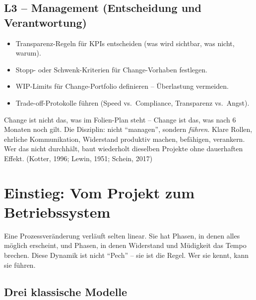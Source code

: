 \documentclass[11pt,a4paper,oneside]{article}
\newcommand{\quelle}[1]{{\footnotesize\color{lpGray}(#1)}}
\begin{document}
\subsection*{L3 -- Management (Entscheidung und Verantwortung)}
\begin{itemize}
  \item Transparenz-Regeln für KPIs entscheiden (was wird sichtbar, was nicht, warum).
  \item Stopp- oder Schwenk-Kriterien für Change-Vorhaben festlegen.
  \item WIP-Limits für Change-Portfolio definieren -- Überlastung vermeiden.
  \item Trade-off-Protokolle führen (Speed vs.\ Compliance, Transparenz vs.\ Angst).
\end{itemize}

\begin{merkbox}
Change ist nicht das, was im Folien-Plan steht -- Change ist das, was nach 6 Monaten noch gilt. Die Disziplin: nicht ``managen'', sondern \emph{führen}. Klare Rollen, ehrliche Kommunikation, Widerstand produktiv machen, befähigen, verankern. Wer das nicht durchhält, baut wiederholt dieselben Projekte ohne dauerhaften Effekt. \quelle{Kotter, 1996; Lewin, 1951; Schein, 2017}
\end{merkbox}

\clearpage

\section{Einstieg: Vom Projekt zum Betriebssystem}

Eine Prozessveränderung verläuft selten linear. Sie hat Phasen, in denen alles möglich erscheint, und Phasen, in denen Widerstand und Müdigkeit das Tempo brechen. Diese Dynamik ist nicht ``Pech'' -- sie ist die Regel. Wer sie kennt, kann sie führen.

\subsection{Drei klassische Modelle}
\end{document}
